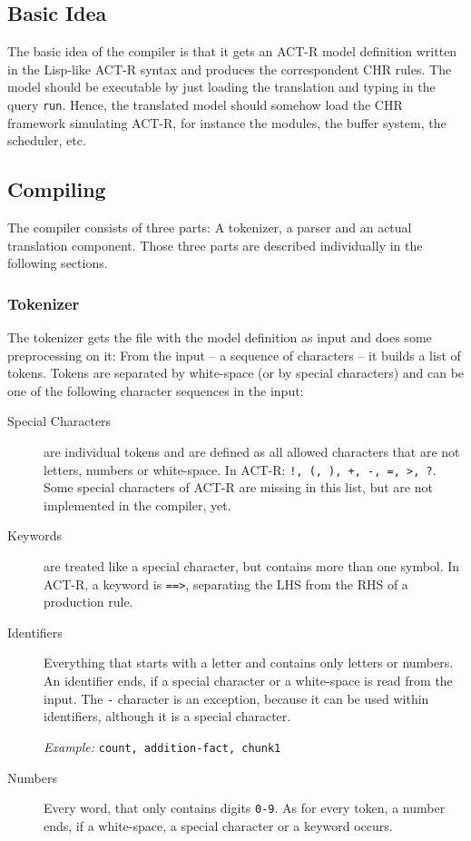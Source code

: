 \subsection{Basic Idea}

The basic idea of the compiler is that it gets an ACT-R model definition written in the Lisp-like ACT-R syntax and produces the correspondent CHR rules. The model should be executable by just loading the translation and typing in the query \lstinline|run|. Hence, the translated model should somehow load the CHR framework simulating ACT-R, for instance the modules, the buffer system, the scheduler, etc. %

\subsection{Compiling}

The compiler consists of three parts: A tokenizer, a parser and an actual translation component. Those three parts are described individually in the following sections.

\subsubsection{Tokenizer}

The tokenizer gets the file with the model definition as input and does some preprocessing on it: From the input -- a sequence of characters -- it builds a list of tokens. Tokens are separated by white-space (or by special characters) and can be one of the following character sequences in the input:

\begin{description}
 \item[Special Characters] are individual tokens and are defined as all allowed characters that are not letters, numbers or white-space. In ACT-R: \lstinline|!, (, ), +, -, =, >, ?|. Some special characters of ACT-R are missing in this list, but are not implemented in the compiler, yet.
 \item[Keywords] are treated like a special character, but contains more than one symbol. In ACT-R, a keyword is \lstinline|==>|, separating the LHS from the RHS of a production rule.
 \item[Identifiers] Everything that starts with a letter and contains only letters or numbers. An identifier ends, if a special character or a white-space is read from the input. The \lstinline|-| character is an exception, because it can be used within identifiers, although it is a special character.
 
 \emph{Example:} \lstinline|count, addition-fact, chunk1|
 \item[Numbers] Every word, that only contains digits \lstinline|0-9|. As for every token, a number ends, if a white-space, a special character or a keyword occurs.
\end{description}

